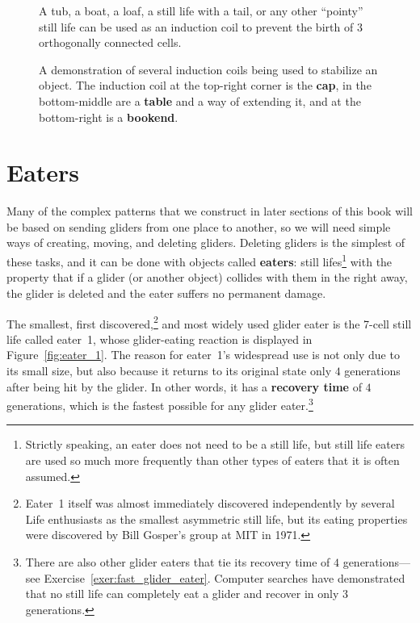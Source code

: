 \begin{figure}[!htb]
	\centering
	\begin{minipage}{.31\textwidth}
		\centering
		\caption{A tub, a boat, a loaf, a still life with a tail, or any other ``pointy'' still life can be used as an induction coil to prevent the birth of $3$ orthogonally connected cells.}
		\label{fig:5_cell_induction}
	\end{minipage} \quad %
	\begin{minipage}{.64\textwidth}
		\centering
		\caption{A demonstration of several induction coils being used to stabilize an object. The induction coil at the top-right corner is the \textbf{cap}, in the bottom-middle are a \textbf{table} and a way of extending it, and at the bottom-right is a \textbf{bookend}.}
		\label{fig:induction_coil_examples}
	\end{minipage}
\end{figure}


\section{Eaters}\label{sec:eaters}

Many of the complex patterns that we construct in later sections of this book will be based on sending gliders from one place to another, so we will need simple ways of creating, moving, and deleting gliders. Deleting gliders is the simplest of these tasks, and it can be done with objects called \textbf{eaters}: still lifes\footnote{Strictly speaking, an eater does not need to be a still life, but still life eaters are used so much more frequently than other types of eaters that it is often assumed.} with the property that if a glider (or another object) collides with them in the right away, the glider is deleted and the eater suffers no permanent damage.

The smallest, first discovered,\footnote{Eater~1 itself was almost immediately discovered independently by several Life enthusiasts as the smallest asymmetric still life, but its eating properties were discovered by Bill Gosper's group at MIT in 1971.} and most widely used glider eater is the 7-cell still life called eater~1, whose glider-eating reaction is displayed in Figure~\ref{fig:eater_1}. The reason for eater~1's widespread use is not only due to its small size, but also because it returns to its original state only $4$ generations after being hit by the glider. In other words, it has a \textbf{recovery time} of $4$ generations, which is the fastest possible for any glider eater.\footnote{There are also other glider eaters that tie its recovery time of $4$ generations---see Exercise~\ref{exer:fast_glider_eater}. Computer searches have demonstrated that no still life can completely eat a glider and recover in only $3$ generations.}

